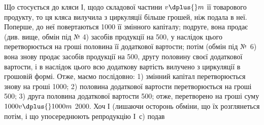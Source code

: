 Що стосується до кляси І, щодо складової частини $v \dplus{} m$ її товарового
продукту, то ця кляса вилучила з циркуляції більше грошей, ніж подала
в неї. Поперше, до неї повертаються 1000 її змінного капіталу;
подруге, вона продає (див. вище, обмін під № 4) засобів продукції
на 500, у наслідок цього перетворюється на гроші половина
її додаткової вартости; потім (обмін під №~6) вона знову продає засобів
продукції на 500, другу половину своєї додаткової вартости,
і в наслідок цього всю додаткову вартість вилучено з циркуляції в грошовій
формі. Отже, маємо послідовно: 1) змінний капітал перетворюється
знову на гроші \deq{} 1000; 2) половина додаткової вартости перетворюється
на гроші \deq{} 500; 3) друга половина додаткової
вартости \deq{} 500; отже, перетворено на гроші суму
$1000 v \dplus{} 1000 m$ \deq{} 2000. Хоч І (лишаючи осторонь обміни,
що їх розглянеться потім, і що упосереднюють репродукцію І~$с$) подав
\parbreak{}  %
